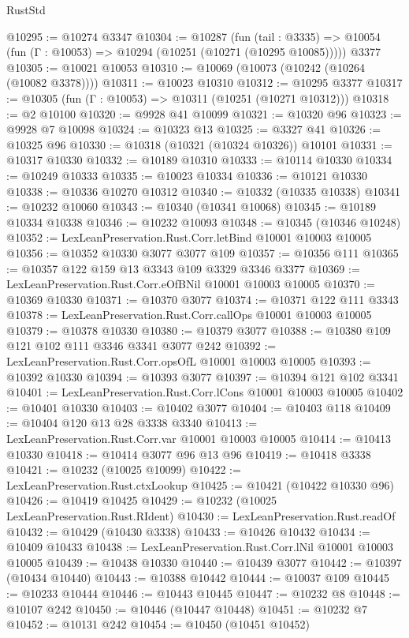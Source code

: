 \begin{lexlean}{RustStd}
\begin{coremodule}
@10295 := @10274 @3347
@10304 := @10287
    (fun (tail : @3335) => @10054 (fun (Γ : @10053) => @10294 (@10251 (@10271 (@10295 @10085)))))
    @3377
@10305 := @10021 @10053
@10310 := @10069 (@10073 (@10242 (@10264 (@10082 @3378))))
@10311 := @10023 @10310
@10312 := @10295 @3377
@10317 := @10305 (fun (Γ : @10053) => @10311 (@10251 (@10271 @10312)))
@10318 := @2 @10100
@10320 := @9928 @41 @10099
@10321 := @10320 @96
@10323 := @9928 @7 @10098
@10324 := @10323 @13
@10325 := @3327 @41
@10326 := @10325 @96
@10330 := @10318 (@10321 (@10324 @10326)) @10101
@10331 := @10317 @10330
@10332 := @10189 @10310
@10333 := @10114 @10330
@10334 := @10249 @10333
@10335 := @10023 @10334
@10336 := @10121 @10330
@10338 := @10336 @10270 @10312
@10340 := @10332 (@10335 @10338)
@10341 := @10232 @10060
@10343 := @10340 (@10341 @10068)
@10345 := @10189 @10334 @10338
@10346 := @10232 @10093
@10348 := @10345 (@10346 @10248)
@10352 := LexLeanPreservation.Rust.Corr.letBind @10001 @10003 @10005
@10356 := @10352 @10330 @3077 @3077 @109
@10357 := @10356 @111
@10365 := @10357 @122 @159 @13 @3343 @109 @3329 @3346 @3377
@10369 := LexLeanPreservation.Rust.Corr.eOfBNil @10001 @10003 @10005
@10370 := @10369 @10330
@10371 := @10370 @3077
@10374 := @10371 @122 @111 @3343
@10378 := LexLeanPreservation.Rust.Corr.callOps @10001 @10003 @10005
@10379 := @10378 @10330
@10380 := @10379 @3077
@10388 := @10380 @109 @121 @102 @111 @3346 @3341 @3077 @242
@10392 := LexLeanPreservation.Rust.Corr.opsOfL @10001 @10003 @10005
@10393 := @10392 @10330
@10394 := @10393 @3077
@10397 := @10394 @121 @102 @3341
@10401 := LexLeanPreservation.Rust.Corr.lCons @10001 @10003 @10005
@10402 := @10401 @10330
@10403 := @10402 @3077
@10404 := @10403 @118
@10409 := @10404 @120 @13 @28 @3338 @3340
@10413 := LexLeanPreservation.Rust.Corr.var @10001 @10003 @10005
@10414 := @10413 @10330
@10418 := @10414 @3077 @96 @13 @96
@10419 := @10418 @3338
@10421 := @10232 (@10025 @10099)
@10422 := LexLeanPreservation.Rust.ctxLookup
@10425 := @10421 (@10422 @10330 @96)
@10426 := @10419 @10425
@10429 := @10232 (@10025 LexLeanPreservation.Rust.RIdent)
@10430 := LexLeanPreservation.Rust.readOf
@10432 := @10429 (@10430 @3338)
@10433 := @10426 @10432
@10434 := @10409 @10433
@10438 := LexLeanPreservation.Rust.Corr.lNil @10001 @10003 @10005
@10439 := @10438 @10330
@10440 := @10439 @3077
@10442 := @10397 (@10434 @10440)
@10443 := @10388 @10442
@10444 := @10037 @109
@10445 := @10233 @10444
@10446 := @10443 @10445
@10447 := @10232 @8
@10448 := @10107 @242
@10450 := @10446 (@10447 @10448)
@10451 := @10232 @7
@10452 := @10131 @242
@10454 := @10450 (@10451 @10452)

\end{coremodule}
\end{lexlean}

